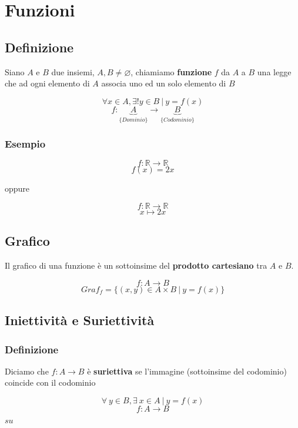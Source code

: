 \section{Funzioni}
\subsection{Definizione}
Siano $A$ e $B$ due insiemi, $A,B \neq \varnothing$, chiamiamo \textbf{funzione} $f$ da $A$ a $B$
una legge che ad ogni elemento di $A$ associa uno ed un solo elemento di $B$
\begin{Large}
\[
    \forall x \in A, \exists! y \in B\ |\ y = f(x)    
\]
\vspace{-1em}
\[
    f: \underbrace{A}_{\{Dominio\}} \rightarrow \underbrace{B}_{\{Codominio\}}
\]
\end{Large}
\subsubsection*{Esempio}
\begin{Large}
\[
    f: \mathbb{R} \rightarrow \mathbb{R}    
\]
\[
    f(x) = 2x    
\]
\end{Large}
oppure
\begin{Large}
\[
    f: \mathbb{R} \rightarrow \mathbb{R}
\]
\[
    x \mapsto 2x
\]
\end{Large}

\subsection{Grafico}
Il grafico di una funzione è un sottoinsime del \textbf{prodotto cartesiano} tra $A$ e $B$.
\begin{Large}
\[
    f:A \rightarrow B
\]
\[
    Graf_{f}= \{(x,y) \in A \times B\ |\ y=f(x)\}
\]
\end{Large}
\subsection{Iniettività e Suriettività}
\subsubsection*{Definizione}
Diciamo che $f:A\rightarrow B$ è \textbf{suriettiva} se l'immagine (sottoinsime del codominio) coincide
con il codominio
\begin{large}
\[
    \forall\ y \in B, \exists\ x \in A\ |\ y = f(x)    
\]
\[
    f:A \rightarrow B
\]
\end{large}
\vspace{-7ex}
\begin{center}
\begin{small}
    \hspace{0.5cm}$su$
\end{small}
\end{center}
